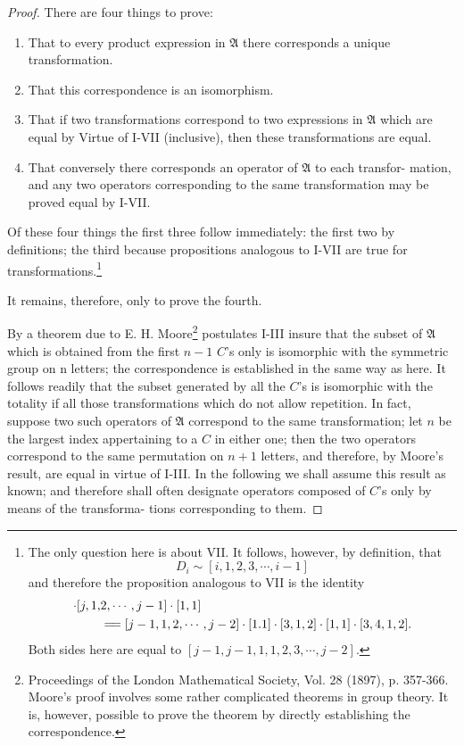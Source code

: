 \documentclass[10pt, twoside]{extarticle}
\newcommand{\td}[2][] {\todo[tickmarkheight=3pt, inline, size=\tiny, #1]{#2}}
\newcommand\longeq{=\joinrel=}
\theoremstyle{breaktheorem}
\theoremstyle{mylemma}
\theoremstyle{mydefinition}
\theoremstyle{mycorollary}
\begin{document}
\begin{proof}
  \td{newline after proof}
  There are four things to prove:
  \begin{enumerate}[label=\arabic*)]
  \item That to every product expression in \(\mathfrak{A}\) there corresponds a unique
    transformation.
  \item That this correspondence is an isomorphism.
  \item That if two transformations correspond to two expressions in \(\mathfrak{A}\) which
    are equal by Virtue of I-VII (inclusive), then these transformations are equal.
  \item That conversely there corresponds an operator of \(\mathfrak{A}\) to each transfor-
    mation, and any two operators corresponding to the same transformation may
    be proved equal by I-VII.
  \end{enumerate}

  Of these four things the first three follow immediately: the first two
  by definitions; the third because propositions analogous to I-VII are true
  \setcounter{footnote}{1} %
  for transformations.\footnote{The only question here is about VII. It follows, however, by definition, that
    \[D_i \sim [i, 1, 2, 3, \cdots, i-1]\]
    and therefore the proposition analogous to VII is the identity
    \begin{align*}
      [1, 1] \cdot [j, 1, &2, \cdots, j-1] \cdot [1,1] \\
      &\longeq [j-1, 1, 2, \cdots, j-2] \cdot [1. 1] \cdot [3, 1, 2] \cdot [1, 1] \cdot [3, 4, 1, 2].
    \end{align*}
    Both sides here are equal to \([j-1, j-1, 1, 1, 2, 3, \cdots, j-2].\)
  }

  \noindent It remains, therefore, only to prove the fourth.

  By a theorem due to E. H. Moore\footnote{Proceedings of the London Mathematical Society, Vol. 28 (1897), p. 357-366. Moore's proof involves some rather complicated theorems in group theory. It is, however, possible to prove the theorem by directly establishing the correspondence.} postulates I-III insure that the
  subset of \(\mathfrak{A}\) which is obtained from the first \(n-1\) \(C\)'s only is isomorphic
  with the symmetric group on n letters; the correspondence is established in
the same way as here. It follows readily that the subset generated by all the
\(C\)'s is isomorphic with the totality if all those transformations which do
not allow repetition. In fact, suppose two such operators of \(\mathfrak{A}\) correspond
to the same transformation; let \(n\) be the largest index appertaining to a \(C\)
in either one; then the two operators correspond to the same permutation on
\(n + 1\) letters, and therefore, by Moore's result, are equal in virtue of I-III.
In the following we shall assume this result as known; and therefore shall
often designate operators composed of \(C\)'s only by means of the transforma-
tions corresponding to them.


\end{proof}
\end{document}
